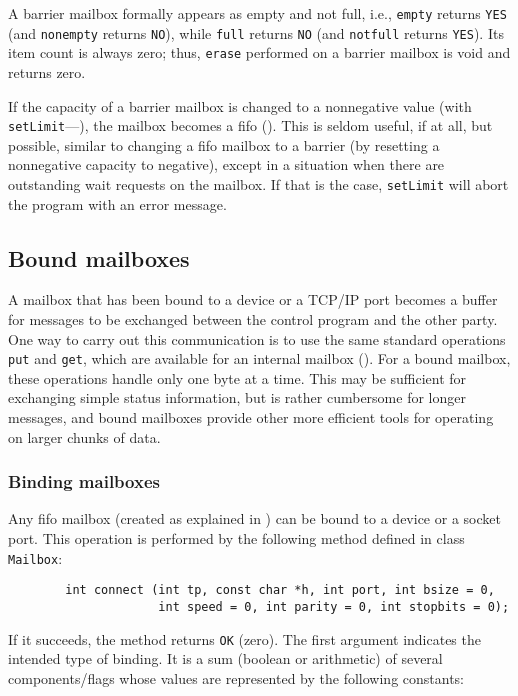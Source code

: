 A barrier mailbox formally appears as empty and not full, i.e.,
{\tt empty} returns {\tt YES} (and {\tt nonempty} returns {\tt NO}),
while {\tt full} returns {\tt NO} (and {\tt notfull} returns {\tt YES}).
Its item count is always zero;
thus, {\tt erase} performed on a barrier mailbox is void and returns zero.

If the capacity of a barrier mailbox is changed to a nonnegative value
(with {\tt setLimit}---), the mailbox becomes a fifo
().
This is seldom useful, if at all, but
possible, similar to changing a fifo mailbox to a barrier
(by resetting a nonnegative capacity to negative), except
in a situation when there are outstanding wait requests on the mailbox.
If that is the case, {\tt setLimit} will abort the program with an error
message.

\subsection{Bound mailboxes}
\label{rm_mb_bo}

A mailbox that has been bound to a device or a TCP/IP port becomes a buffer
for messages to be exchanged between the control program and the other party.
One way to carry out this communication is to use the same standard operations
{\tt put} and {\tt get}, which are available for an internal mailbox
().
For a bound mailbox, these operations handle only one byte at a time.
This may be sufficient for exchanging simple status information,
but is rather cumbersome for longer messages, and bound mailboxes provide
other more efficient tools for operating on larger chunks of data.

\subsubsection{Binding mailboxes}
\label{rm_mb_bo_bi}

Any fifo mailbox (created as explained in )
can be bound to a device or a socket port.
This operation is performed by the following method defined in class
{\tt Mailbox}:
\begin{verbatim}
        int connect (int tp, const char *h, int port, int bsize = 0,
                     int speed = 0, int parity = 0, int stopbits = 0);
\end{verbatim}
If it succeeds, the method returns {\tt OK} (zero).
The first argument indicates the intended type of binding.
It is a sum (boolean or arithmetic) of several components/flags
whose values are represented by the following constants:

